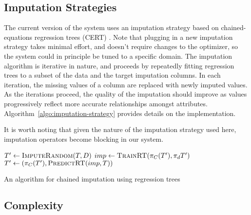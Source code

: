 \subsection{Imputation Strategies}
The current version of the system uses an imputation strategy based on chained-equations regression trees (CERT) . Note that plugging in a new
imputation strategy takes minimal effort, and doesn't require changes to the optimizer, so the system could in principle be tuned to a specific domain.
The imputation algorithm is iterative in nature, and proceeds by repeatedly fitting regression trees to a subset of the data and the target imputation columns.
In each iteration, the missing values of a column are replaced with newly imputed values. As the iterations proceed, the quality of the imputation
should improve as values progressively reflect more accurate relationships amongst attributes. Algorithm~\ref{algo:imputation-strategy}
provides details on the implementation.

It is worth noting that given the nature of the imputation strategy used here, imputation operators become blocking in our system.

\begin{algorithm}
  \begin{algorithmic}
    
    	\State $T' \gets \Call{ImputeRandom}{T, D}$
			\State $imp \gets \Call{TrainRT}{\pi_C(T'), \pi_d{T'}}$
			\State $T' \gets (\pi_C(T'), \Call{PredictRT}{imp, T})$
		\EndFor
	\EndFor
	\EndFunction
  \end{algorithmic}
  \caption{An algorithm for chained imputation using regression trees}
  \label{algo:imputation-strategy}
\end{algorithm}





\subsection{Complexity}

